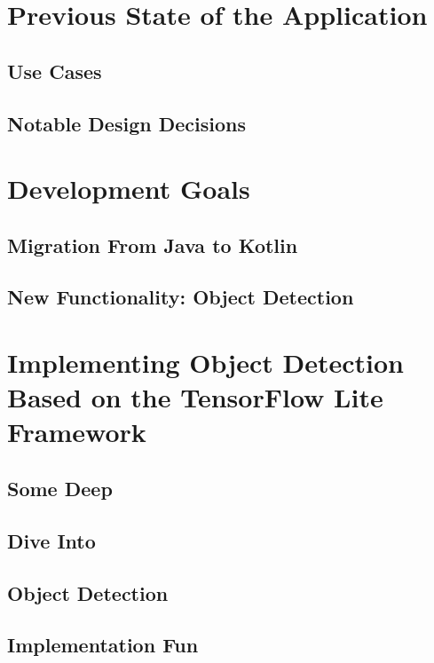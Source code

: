 \documentclass[11pt,
               a4paper,
               bibtotoc,
               idxtotoc,
               headsepline,
               footsepline,
               footexclude,
               BCOR12mm,
               DIV13,
               openany,   %
               ]
               {scrbook}
\begin{document}
\section{Previous State of the Application}

\subsection{Use Cases}

\subsection{Notable Design Decisions}

\section{Development Goals}

\subsection{Migration From Java to Kotlin}

\subsection{New Functionality: Object Detection}

\section{Implementing Object Detection Based on the TensorFlow Lite Framework}

\subsection{Some Deep}
\subsection{Dive Into}
\subsection{Object Detection}
\subsection{Implementation Fun}

\end{document}
